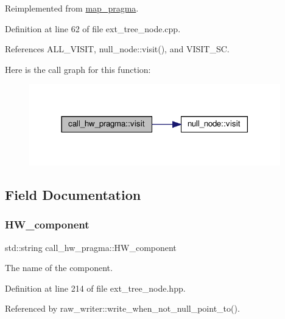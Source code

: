 Reimplemented from \hyperlink{structmap__pragma_a418af88fad63d1e91a1d1b12bc19b70c}{map\+\_\+pragma}.



Definition at line 62 of file ext\+\_\+tree\+\_\+node.\+cpp.



References A\+L\+L\+\_\+\+V\+I\+S\+IT, null\+\_\+node\+::visit(), and V\+I\+S\+I\+T\+\_\+\+SC.

Here is the call graph for this function\+:
\nopagebreak
\begin{figure}[H]
\begin{center}
\leavevmode
\includegraphics[width=309pt]{d9/d2f/structcall__hw__pragma_a7ad2f9a214388ac8de0806ff6c8db2bc_cgraph}
\end{center}
\end{figure}


\subsection{Field Documentation}
\mbox{\label{structcall__hw__pragma_a5dac433f53d27b6afb9ddc9d1022b9fa}} 
\subsubsection{\texorpdfstring{H\+W\+\_\+component}{HW\_component}}
{\footnotesize\ttfamily std\+::string call\+\_\+hw\+\_\+pragma\+::\+H\+W\+\_\+component}



The name of the component. 



Definition at line 214 of file ext\+\_\+tree\+\_\+node.\+hpp.



Referenced by raw\+\_\+writer\+::write\+\_\+when\+\_\+not\+\_\+null\+\_\+point\+\_\+to().

